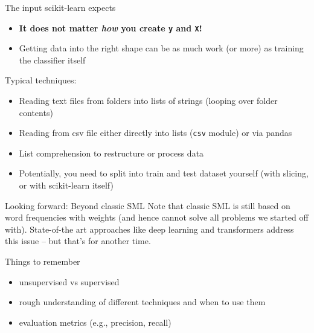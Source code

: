 \begin{frame}{The input scikit-learn expects}
  \begin{itemize}
  \item \textbf{It does not matter \emph{how} you create \texttt{y} and \texttt{X}!}
  \item Getting data into the right shape can be as much work (or more) as training the classifier itself
  \end{itemize}
  \pause
  Typical techniques:
  \begin{itemize}
  \item Reading text files from folders into lists of strings (looping over folder contents)
  \item Reading from csv file either directly into lists (\texttt{csv} module) or via pandas
  \item List comprehension to restructure or process data
  \item Potentially, you need to split into train and test dataset yourself (with slicing, or  with scikit-learn itself)
  \end{itemize}
\end{frame}






\begin{frame}{Looking forward: Beyond classic SML}
Note that classic SML is still based on word frequencies with weights (and hence cannot solve all problems we started off with). State-of-the art approaches like deep learning and transformers address this issue -- but that's for another time.
  
\end{frame}








\begin{frame}{Things to remember}
  \begin{itemize}
  \item unsupervised vs supervised
  \item rough understanding of different techniques and when to use them
  \item evaluation metrics (e.g., precision, recall)
\end{itemize}
\end{frame}


\begin{frame}[plain]
	\printbibliography
\end{frame}



